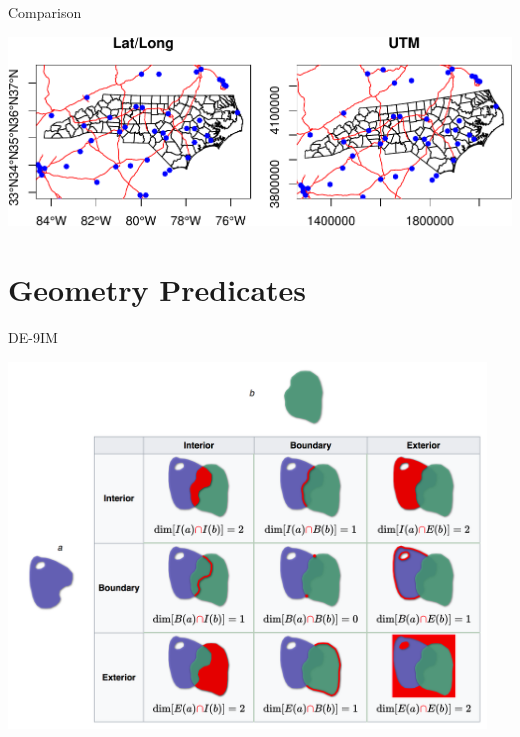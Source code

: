 \documentclass[11pt,ignorenonframetext,]{beamer}
\begin{document}
\begin{frame}{Comparison}
\protect\hypertarget{comparison}{}

\begin{center}\includegraphics[width=\textwidth]{Lec15_files/figure-beamer/unnamed-chunk-24-1} \end{center}

\end{frame}

\hypertarget{geometry-predicates}{%
\section{Geometry Predicates}\label{geometry-predicates}}

\begin{frame}{DE-9IM}
\protect\hypertarget{de-9im}{}

\begin{center}
\includegraphics[width=0.95\textwidth]{figs/de_9im.png}
\end{center}

\end{frame}
\end{document}
